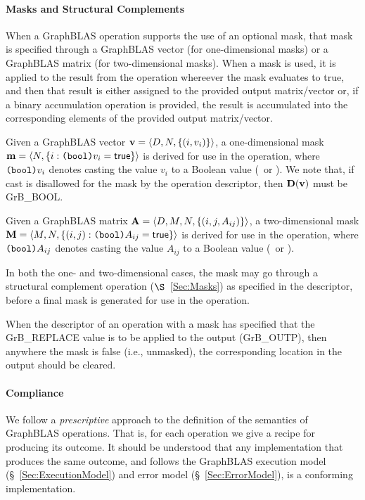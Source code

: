 \paragraph{Masks and Structural Complements}

%
%

When a GraphBLAS operation supports the use of an optional mask, that mask is
specified through a GraphBLAS vector (for one-dimensional masks) or
a GraphBLAS matrix (for two-dimensional masks).  When a mask is used, it is 
applied to the result from the operation whereever the mask evaluates to true, 
and then that result is either assigned 
to the provided output matrix/vector or, if a binary accumulation operation is 
provided, the result is accumulated into the corresponding elements of the provided 
output matrix/vector.

Given a GraphBLAS vector ${\bf v} = \langle D,N, \{ (i,v_i) \} \rangle$, a
one-dimensional mask ${\bf m} = \langle N, \{ i : \mbox{\tt (bool)}v_i = {\sf true} \} \rangle$
is derived for use in the operation, where $\mbox{\tt (bool)}v_i$ denotes
casting the value $v_i$ to a Boolean value (\true\ or \false).
We note that, if cast is disallowed for the mask by the operation descriptor, then
$\bold{D}({\bf v})$ must be {\sf GrB\_BOOL}.

Given a GraphBLAS matrix ${\bf A} = \langle D, M, N, \{ (i,j,A_{ij}) \} \rangle$,
a two-dimensional mask ${\bf M} = \langle M,N, \{ (i,j) : \mbox{\tt (bool)}A_{ij} = {\sf true} \} \rangle$
is derived for use in the operation, where $\mbox{\tt (bool)}A_{ij}$ denotes
casting the value $A_{ij}$ to a Boolean value (\true\ or \false).

In both the one- and two-dimensional cases, the mask may go through a structural
complement operation ($\S$~\ref{Sec:Masks}) as specified in the descriptor, before 
a final mask is generated for use in the operation.

When the descriptor of an operation with a mask has specified that 
the {\sf GrB\_REPLACE} value is to be applied to the output ({\sf GrB\_OUTP}),
then anywhere the mask is false (i.e., unmasked), the corresponding location in
the output should be cleared.

 

\paragraph{Compliance}

We follow a \emph{prescriptive} approach to the definition of the semantics
of GraphBLAS operations. That is, for each operation we give a recipe for
producing its outcome.
It should be understood that any implementation that produces the same outcome,
and follows the GraphBLAS execution model (\S~\ref{Sec:ExecutionModel}) and
error model (\S~\ref{Sec:ErrorModel}), is a conforming implementation.
